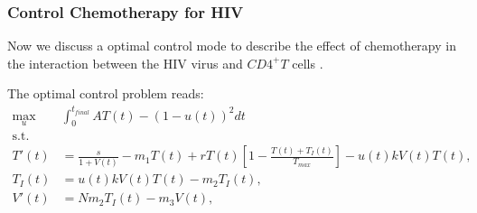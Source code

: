 \subsubsection*{Control Chemotherapy for HIV} 
	Now we discuss a optimal control mode to describe the effect of chemotherapy
in the interaction between the HIV virus and $CD4^+T$ cells 
\cite{butler1997optimal}.

The optimal control problem reads:
\begin{equation} \label{eqn:hiv_infect}
	\begin{aligned}
		\max_{u} & \int_{0}^{t_{final}}
			A  T(t) - (1-u(t)) ^ 2 dt
		\\
		\text{s.t. }
		\\
			T'(t) &=
				\frac{s}{1 + V(t)}
				- m_1 T(t) 
				+ r T(t)
				\left[
					1 - \frac{T(t)+ T_{I}(t)}{T_{max}}
				\right] 
				- u(t) k V(t) T(t),
			\\
			T_{I}(t) &=
				u(t) k V(t) T(t) - m_2 T_{I}(t),
			\\
			V'(t) &= N m_2 T_{I}(t) - m_3 V(t),
			\\
	\end{aligned}
\end{equation}


